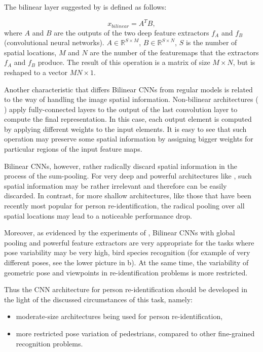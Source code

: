 The bilinear layer suggested by \citep{lin2015bilinear} is defined as follows:

\begin{equation}
   \label{eq:bilinear}
    x_{bilinear} = A^T B,
\end{equation}
where $A$ and $B$ are the outputs of the two deep feature extractors $f_A$ and $f_B$ (convolutional neural networks). $A \in \mathbb{R}^{S \times M}$, $B \in \mathbb{R}^{S \times N}$, $S$ is the number of spatial locations, $M$ and $N$ are the number of the featuremaps that the extractors $f_A$ and $f_B$ produce. The result of this operation is a matrix of size $M \times N$, but is reshaped to a vector $MN \times 1$.

Another characteristic that differs Bilinear CNNs from regular models is related to the way of handling the image spatial information. Non-bilinear architectures (\eg{} \citep{simonyan2014very}) apply fully-connected layers to the output of the last convolution layer to compute the final representation. In this case, each output element is computed by applying different weights to the input elements. It is easy to see that such operation may preserve some spatial information by assigning bigger weights for particular regions of the input feature maps. 

Bilinear CNNs, however, rather radically discard spatial information in the process of the sum-pooling. For very deep and powerful architectures like \citep{simonyan2014very}, such spatial information may be rather irrelevant and therefore can be easily discarded. In contrast, for more shallow architectures, like those that have been recently most popular for person re-identification, the radical pooling over all spatial locations may lead to a noticeable performance drop.

Moreover, as evidenced by the experiments of \citep{lin2015bilinear}, Bilinear CNNs with global pooling and powerful feature extractors are very appropriate for the tasks where pose variability may be very high, \eg{} bird species recognition  (for example of very different poses, see the lower picture in b). At the same time, the variability of geometric pose and viewpoints in re-identification problems is more restricted.

Thus the CNN architecture for person re-identification should be developed in the light of the discussed circumstances of this task, namely:
\begin{itemize}
    \item moderate-size architectures being used for person re-identification,
    \item more restricted pose variation of pedestrians, compared to other fine-grained recognition problems.
\end{itemize}
   
